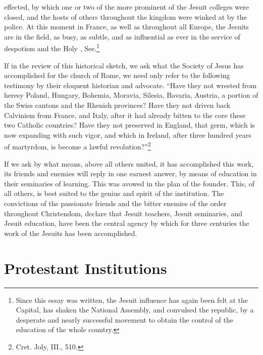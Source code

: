 \documentclass[]{book}
\let\rmarkdownfootnote\footnote%
\def\footnote{\protect\rmarkdownfootnote}
\begin{document}
effected, by which one or two of the more prominent of the Jesuit colleges were closed, and the hosts of others throughout the kingdom were winked at by the police. At this moment in France, as well as throughout all Europe, the Jesuits are in the field, as busy, as subtle, and as influential as ever in the service of despotism and the Holy , See.\footnote{Since this essay was written, the Jesuit influence has again been felt at the Capital, has shaken the National Assembly, and convulsed the republic, by a desperate and nearly successful movement to obtain the control of the education of the whole country.}

If in the review of this historical sketch, we ask what the Society of Jesus has accomplished for the church of Rome, we need only refer to the following testimony by their eloquent historian and advocate. ``Have they not wrested from heresy Poland, Hungary, Bohemia, Moravia, Silesia, Bavaria, Austria, a portion of the Swiss cantons and the Rhenish provinces? Have they not driven back Calvinism from France, and Italy, after it had already bitten to the core these two Catholic countries? Have they not preserved in England, that germ, which is now expanding with such vigor, and which in Ireland, after three hundred years of martyrdom, is become a lawful revolution?''\footnote{Cret. Joly, III., 510.}

If we ask by what means, above all others united, it has accomplished this work, its friends and enemies will reply in one earnest answer, by means of education in their seminaries of learning. This was avowed in the plan of the founder. This, of all others, is best suited to the genius and spirit of the institution. The convictions of the passionate friends and the bitter enemies of the order throughout Christendom, declare that Jesuit teachers, Jesuit seminaries, and Jesuit education, have been the central agency by which for three centuries the work of the Jesuits has been accomplished.

\hypertarget{protestant-institutions}{%
\chapter{Protestant Institutions}\label{protestant-institutions}}
\end{document}
